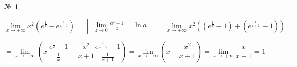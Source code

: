 \documentclass{article}
\begin{document}
\textbf{№ 1}
\Large

$$ \lim\limits_{x\to +\infty} x^2 \left( e^{\frac{1}{x}} - e^{\frac{1}{x+1}} \right) 
= \begin{vmatrix} \lim\limits_{z\to 0} \frac{a^{z} - 1}{z} = \ln{a} \end{vmatrix}
= \lim\limits_{x\to +\infty} x^2 \left( (e^{\frac{1}{x}} - 1) +  (e^{\frac{1}{x+1}} - 1) \right) 
= $$

$$ = \lim\limits_{x\to +\infty} \left( x \ \frac{e^{\frac{1}{x}} - 1}{\frac{1}{x}} - \frac{x^2}{x+1} \frac{ e^{\frac{1}{x+1}} -1 }{ \frac{1}{x+1} } \right)
= \lim\limits_{x\to +\infty} \left( x - \frac{x^2}{x+1} \right) 
= \lim\limits_{x\to +\infty} \frac{x}{x+1}
= 1$$
\end{document}

